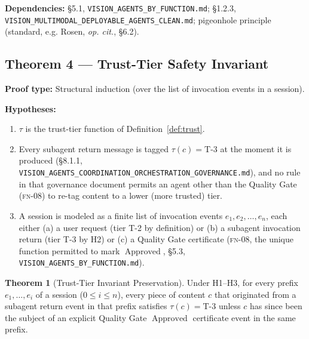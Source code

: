\documentclass[12pt]{article}
\theoremstyle{definition}
\newtheorem{theorem}{Theorem}
\newcommand{\code}[1]{\texttt{#1}}
\newcommand{\FN}[1]{\textsc{fn-#1}}
\DeclareMathOperator{\Approved}{Approved}
\newcommand{\VisionClean}{\code{VISION\_MULTIMODAL\_\allowbreak DEPLOYABLE\_\allowbreak AGENTS\_CLEAN.md}}
\newcommand{\VisionGov}{\code{VISION\_AGENTS\_\allowbreak COORDINATION\_\allowbreak ORCHESTRATION\_\allowbreak GOVERNANCE.md}}
\newcommand{\VisionFunc}{\code{VISION\_AGENTS\_\allowbreak BY\_FUNCTION.md}}
\begin{document}
\begin{sloppypar}
\textbf{Dependencies:} \S5.1, \VisionFunc{};
\S1.2.3, \VisionClean{}; pigeonhole
principle (standard, e.g. Rosen, \emph{op. cit.}, \S6.2).
\end{sloppypar}

\subsection{Theorem 4 --- Trust-Tier Safety Invariant}

\textbf{Proof type:} Structural induction (over the list of invocation
events in a session).

\textbf{Hypotheses:}
\begin{enumerate}
    \item[H1] $\tau$ is the trust-tier function of
              Definition~\ref{def:trust}.
    \item[H2] Every subagent return message is tagged $\tau(c) =
              \mathrm{T\text{-}3}$ at the moment it is produced (\S8.1.1,
              \VisionGov{}), and no rule in that governance
              document permits an agent other than the Quality Gate
              (\FN{08}) to re-tag content to a lower (more trusted) tier.
    \item[H3] A session is modeled as a finite list of invocation events
              $e_1, e_2, \ldots, e_n$, each either (a) a user request
              (tier T-2 by definition) or (b) a subagent invocation return
              (tier T-3 by H2) or (c) a Quality Gate certificate
              (\FN{08}, the unique function permitted to mark
              $\Approved$, \S5.3, \VisionFunc{}).
\end{enumerate}

\begin{theorem}[Trust-Tier Invariant Preservation]
\label{thm:trust}
Under H1--H3, for every prefix $e_1,\ldots,e_i$ of a session
($0 \leq i \leq n$), every piece of content $c$ that originated from a
subagent return event in that prefix satisfies $\tau(c) = \mathrm{T\text{-}3}$
unless $c$ has since been the subject of an explicit Quality Gate
$\Approved$ certificate event in the same prefix.
\end{theorem}
\end{document}
